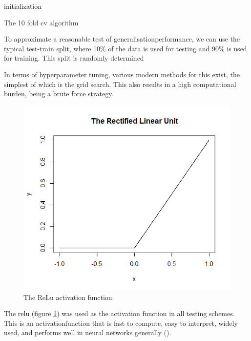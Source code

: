 \begin{algorithm}[H]
\SetAlgoLined
{}
 initialization\;
    \caption{The 10 fold \gls{cv} algorithm}
    \label{algo:10-fold-cv}
\end{algorithm}

\bigskip

To approximate a reasonable test of \gls{generalisationperformance}, we can use the typical test-train split, where 10\% of the data is used for testing and 90\% is used for training. This split is randomly determined 

In terms of \gls{hyperparameter} tuning, various modern methods for this exist, the simplest of which is the grid search. This also results in a high computational burden, being a brute force strategy. 

\begin{figure}
    \includegraphics[scale=0.5]{figs/relu.png}
    \caption{The ReLu activation function.}
    \label{fig:relu_function}
\end{figure}

The \gls{relu} (figure \ref{fig:relu_function}) was used as the activation function in all testing schemes. This is an \gls{activationfunction} that is fast to compute, easy to interpret, widely used, and performs well in neural networks generally (\cite{activation_search}). 

